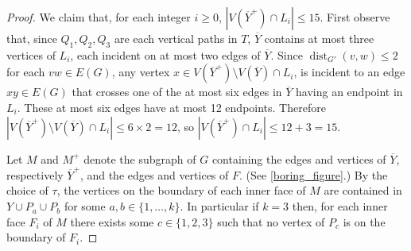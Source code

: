 \documentclass{patmorin}
\DeclareMathOperator{\dist}{dist}
\renewcommand{\ge}{\geqslant}
\renewcommand{\le}{\leqslant}
\begin{document}
\begin{proof}
	We claim that, for each integer $i\ge 0$, $|V(\overline{Y}^+)\cap L_i|\le 15$.  First observe that, since $Q_1,Q_2,Q_3$ are each vertical paths in $T$,  $\overline{Y}$ contains at most three vertices of $L_i$, each incident on at most two edges of $\overline{Y}$.  Since $\dist_{G'}(v,w)\le 2$ for each $vw\in E(G)$, any vertex $x\in V(\overline{Y}^+)\setminus V(\overline{Y})\cap L_i$, is incident to an edge $xy\in E(G)$ that crosses one of the at most six edges in $\overline{Y}$ having an endpoint in $L_i$.  These at most six edges have at most 12 endpoints.  Therefore $|V(\overline{Y}^+)\setminus V(\overline{Y})\cap L_i|\le 6\times 2=12$, so $|V(\overline{Y}^+)\cap L_i|\le 12+3=15$.

	Let $M$ and $M^+$ denote the subgraph of $G$ containing the edges and vertices of $\overline{Y}$, respectively $\overline{Y}^+$, and the edges and vertices of $F$. (See \cref{boring_figure}.)  By the choice of $\tau$, the vertices on the boundary of each inner face of $M$ are contained in $Y\cup P_a\cup P_b$ for some $a,b\in\{1,\ldots,k\}$.  In particular if $k=3$ then, for each inner face $F_i$ of $M$ there exists some $c\in\{1,2,3\}$ such that no vertex of $P_c$ is on the boundary of $F_i$.
  

\end{proof}
\end{document}
